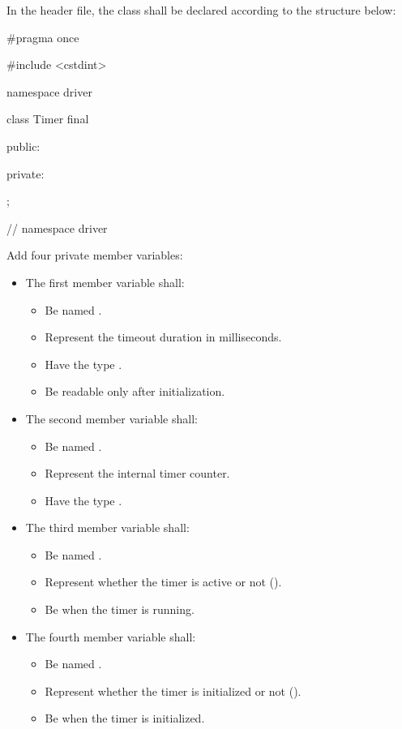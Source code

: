 In the header file, the class shall be declared according to the structure below:

\begin{cppcode}
#pragma once

#include <cstdint>

namespace driver
{
class Timer final
{
public:

private:
};
} // namespace driver
\end{cppcode}

\begin{parts}
  \item Add four private member variables:
  \begin{itemize}
    \item The first member variable shall:
    \begin{itemize}
      \item Be named .
      \item Represent the timeout duration in milliseconds.
      \item Have the type .
      \item Be readable only after initialization.
    \end{itemize}
    \item The second member variable shall:
    \begin{itemize}
      \item Be named .
      \item Represent the internal timer counter.
      \item Have the type .
    \end{itemize}
    \item The third member variable shall:
    \begin{itemize}
      \item Be named .
      \item Represent whether the timer is active or not ().
      \item Be  when the timer is running.
    \end{itemize}
    \item The fourth member variable shall:
    \begin{itemize}
      \item Be named .
      \item Represent whether the timer is initialized or not ().
      \item Be  when the timer is initialized.

\end{itemize}
\end{itemize}
\end{parts}
